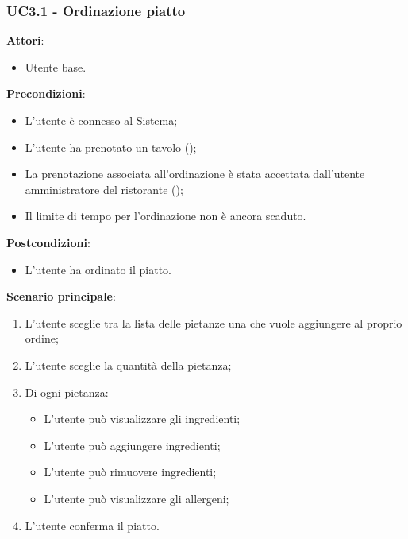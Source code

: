 \subsubsection{UC3.1 - Ordinazione piatto}\label{usecase:3_1}

\textbf{Attori}:
\begin{itemize}
    \item Utente base.
\end{itemize}
\textbf{Precondizioni}:
\begin{itemize}
    \item L'utente è connesso al Sistema; 
    \item L'utente ha prenotato un tavolo ();
    \item La prenotazione associata all'ordinazione è stata accettata dall'utente amministratore del ristorante ();
    \item Il limite di tempo per l'ordinazione non è ancora scaduto.
\end{itemize}
\textbf{Postcondizioni}:
\begin{itemize}
    \item L'utente ha ordinato il piatto.
\end{itemize}
\textbf{Scenario principale}:
\begin{enumerate}
    \item L'utente sceglie tra la lista delle pietanze una che vuole aggiungere al proprio ordine;
    \item L'utente sceglie la quantità della pietanza;
    \item Di ogni pietanza:
    \begin{itemize}
        \item L'utente può visualizzare gli ingredienti;
        \item L'utente può aggiungere ingredienti;
        \item L'utente può rimuovere ingredienti;
        \item L'utente può visualizzare gli allergeni;
    \end{itemize}
    \item L'utente conferma il piatto.
\end{enumerate}
\newpage


